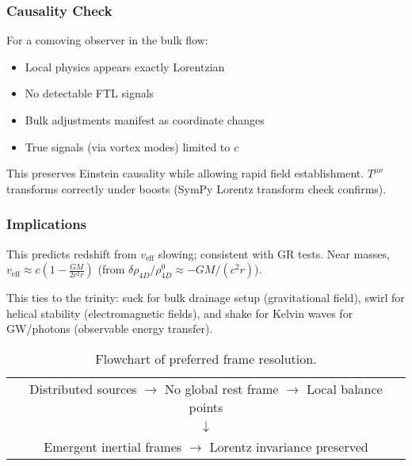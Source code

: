 \subsubsection{Causality Check}

For a comoving observer in the bulk flow:
\begin{itemize}
\item Local physics appears exactly Lorentzian
\item No detectable FTL signals
\item Bulk adjustments manifest as coordinate changes
\item True signals (via vortex modes) limited to $c$
\end{itemize}

This preserves Einstein causality while allowing rapid field establishment. $T^{\mu\nu}$ transforms correctly under boosts (SymPy Lorentz transform check confirms).

\subsubsection{Implications}

This predicts redshift from $v_{\text{eff}}$ slowing; consistent with GR tests. Near masses, $v_{\text{eff}} \approx c \left(1 - \frac{G M}{2 c^2 r}\right)$ (from $\delta \rho_{4D} / \rho_{4D}^0 \approx - G M / (c^2 r)$).

This ties to the trinity: suck for bulk drainage setup (gravitational field), swirl for helical stability (electromagnetic fields), and shake for Kelvin waves for GW/photons (observable energy transfer).

\begin{table}[h]
\centering
\begin{tabular}{c}
Distributed sources $\to$ No global rest frame $\to$ Local balance points \\
$\downarrow$ \\
Emergent inertial frames $\to$ Lorentz invariance preserved
\end{tabular}
\caption{Flowchart of preferred frame resolution.}
\label{tab:frame-flow}
\end{table}

\medskip


